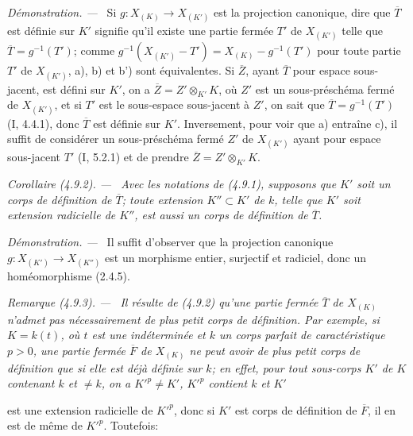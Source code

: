 \documentclass[10pt,oneside]{book}
\newcommand{\oldpage}[2][]{%
  \setcounter{footnote}{0}%
  \marginpar{\scriptsize\textbf{#1}~|~#2}\ignorespaces}
\newenvironment{corollary}[1][]{%
  \par\medskip\noindent\itshape Corollaire (#1). ---\ }{\par}
\newenvironment{remark}[1][]{%
  \par\medskip\noindent\itshape Remarque (#1). ---\ }{\par}
\newenvironment{proof}{%
  \par\medskip\noindent\textit{Démonstration. ---\ }}{\par}
\begin{document}
\begin{proof}
Si $g:X_{(K)}\to X_{(K')}$ est la projection canonique, dire que
$\overline T$ est définie sur $K'$ signifie qu'il existe une partie fermée
$T'$ de $X_{(K')}$ telle que $\overline T=g^{-1}(T')$; comme
$g^{-1}(X_{(K')}-T')=X_{(K)}-g^{-1}(T')$ pour toute partie $T'$ de
$X_{(K')}$, a), b) et b') sont équivalentes. Si $\overline Z$, ayant
$\overline T$ pour espace sous-jacent, est défini sur $K'$, on a
$\overline Z=Z'\otimes_{K'}K$, où $Z'$ est un sous-préschéma fermé de
$X_{(K')}$, et si $T'$ est le sous-espace sous-jacent à $Z'$, on sait que
$\overline T=g^{-1}(T')$ (I, 4.4.1), donc $\overline T$ est définie sur
$K'$. Inversement, pour voir que a) entraîne c), il suffit de considérer un
sous-préschéma fermé $Z'$ de $X_{(K')}$ ayant pour espace sous-jacent $T'$
(I, 5.2.1) et de prendre $\overline Z=Z'\otimes_{K'}K$.
\end{proof}

\begin{corollary}[4.9.2]
\label{IV.2.4.9.2-fr}
Avec les notations de (4.9.1), supposons que $K'$ soit un corps de définition
de $\overline T$; toute extension $K''\subset K'$ de $k$, telle que $K'$ soit
extension radicielle de $K''$, est aussi un corps de définition de
$\overline T$.
\end{corollary}

\begin{proof}
Il suffit d'observer que la projection canonique
$g:X_{(K')}\to X_{(K'')}$ est un morphisme entier, surjectif et radiciel,
donc un homéomorphisme (2.4.5).
\end{proof}

\begin{remark}[4.9.3]
\label{IV.2.4.9.3-fr}
Il résulte de (4.9.2) qu'une partie fermée $\overline T$ de $X_{(K)}$ n'admet
pas nécessairement de \emph{plus petit} corps de définition. Par exemple, si
$K=k(t)$, où $t$ est une indéterminée et $k$ un corps parfait de
caractéristique $p>0$, une partie fermée $\overline F$ de $X_{(K)}$ ne peut
avoir de plus petit corps de définition que si elle est déjà définie sur $k$;
en effet, pour tout sous-corps $K'$ de $K$ contenant $k$ et $\ne k$, on a
$K'^p\ne K'$, $K'^p$ contient $k$ et $K'$

\oldpage[IV-2]{85}

est une extension radicielle de $K'^p$, donc si $K'$ est corps de définition
de $\overline F$, il en est de même de $K'^p$. Toutefois:
\end{remark}
\end{document}
